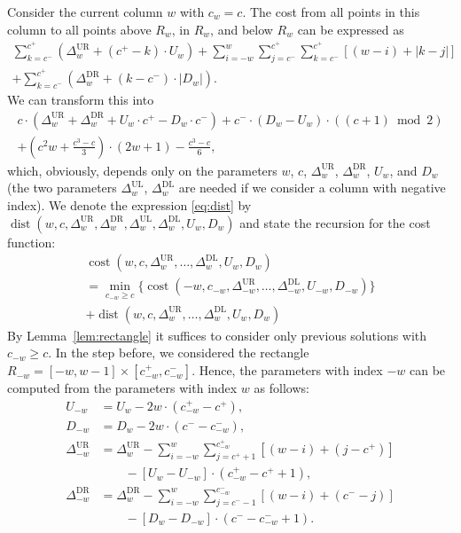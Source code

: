 \documentclass[preprint,authoryear,12pt]{elsarticle}
\DeclareMathOperator{\cost}{cost} \DeclareMathOperator{\dist}{dist}
\begin{document}
Consider the current column $w$ with $c_w=c$. The cost from all
points in this column to all points above $R_w$, in $R_w$, and below
$R_w$ can be expressed as
\begin{multline*}
  \sum_{k=c^-}^{c^+}(\Delta_{w}^{\mathrm{UR}} + (c^+ - k)\cdot U_w)
+\sum_{i=-w}^{w}\sum_{j=c^-}^{c^+}\sum_{k=c^-}^{c^+}[(w-i)+|k-j|]
 \\+ \sum_{k=c^-}^{c^+}(\Delta_{w}^{\mathrm{DR}} + (k - c^-)\cdot|D_w|
)  .
\end{multline*}
We can transform this into
\begin{multline}\label{eq:dist}
 c\cdot(\Delta_{w}^{\mathrm{UR}}+\Delta_{w}^{\mathrm{DR}}+U_w\cdot c^+ -D_w\cdot c^-)
+  c^-\cdot(D_w-U_w)\cdot\left((c+1)\bmod 2\right) \\
+
\left(c^2w+\frac{c^3-c}{3}\right)\cdot(2w+1)-\frac{c^3-c}{6}
,
\end{multline}
which, obviously, depends only on the parameters $w$, $c$,
$\Delta_{w}^{\mathrm{UR}}$, $\Delta_{w}^{\mathrm{DR}}$, $U_w$, and
$D_w$ (the two parameters $\Delta_{w}^{\mathrm{UL}}$,
$\Delta_{w}^{\mathrm{DL}}$ are needed if we consider a column with
negative index). We denote the expression \eqref{eq:dist} by $\dist(w,
c,\Delta_{w}^{\mathrm{UR}}, \Delta_{w}^{\mathrm{DR}},\allowbreak
\Delta_{w}^{\mathrm{UL}},\allowbreak \Delta_{w}^{\mathrm{DL}},\allowbreak U_{w},\allowbreak D_{w})$ and
state the recursion for the cost function:
\begin{multline}\label{eq:recursion}
 \cost(w,c,\Delta_{w}^{\mathrm{UR}},\ldots,\Delta_{w}^{\mathrm{DL}},U_{w},D_{w}) \\
 = \min_{c_{-w}\geq c} \{ \cost(-w, c_{-w},
\Delta_{-w}^{\mathrm{UR}},\ldots,
\Delta_{-w}^{\mathrm{DL}},U_{-w},D_{-w}) \}  \\
 + \dist(w,c,\Delta_{w}^{\mathrm{UR}},\ldots,
\Delta_{w}^{\mathrm{DL}},U_{w},D_{w})
\end{multline}
By Lemma~\ref{lem:rectangle} it suffices to consider only previous
solutions with $c_{-w}\geq c$. In the step before, we considered the
rectangle $R_{-w}=[-w,w-1]\times[c_{-w}^+,c_{-w}^-]$. Hence, the
parameters with index $-w$ can be computed from the parameters with
index $w$ as follows:
\begin{align*}
U_{-w} & =  U_{w} - 2w\cdot(c_{-w}^+ - c^+), \\
D_{-w} & =  D_{w} - 2w\cdot(c^- - c_{-w}^-), \\
\Delta_{-w}^{\mathrm{UR}} & =   \Delta_{w}^{\mathrm{UR}} -
\sum_{i=-w}^{w}\sum_{j=c^+ + 1}^{c_{-w}^+} \left[(w-i) + (j-c^+)\right]
 \\ & \qquad
- \left[ U_w - U_{-w} \right]\cdot (c_{-w}^+ - c^+ + 1), \\
\Delta_{-w}^{\mathrm{DR}} & =   \Delta_{w}^{\mathrm{DR}} -
\sum_{i=-w}^{w}\sum_{j=c^- - 1}^{c_{-w}^-} \left[(w-i) + (c^- - j)\right] \\
 & \qquad - \left[ D_w - D_{-w} \right]\cdot (c^- - c_{-w}^- + 1). \\
\end{align*}
\end{document}
